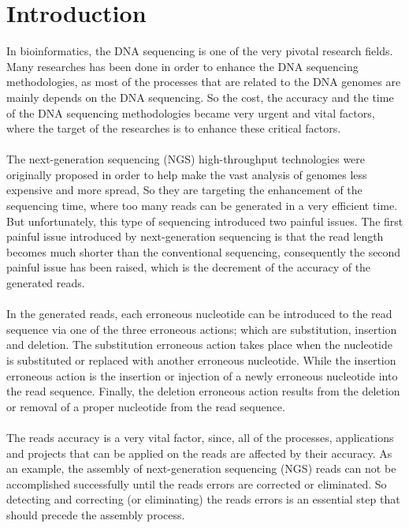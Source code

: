 \documentclass[12pt]{llncs}
\begin{document}
\chapter{\label{chap:1} Introduction}
%
In bioinformatics, the DNA sequencing is one of the very pivotal research fields. Many researches has been done in order to enhance the DNA sequencing methodologies, as most of the processes that are related to the DNA genomes are mainly depends on the DNA sequencing. So the cost, the accuracy and the time of the DNA sequencing methodologies became very urgent and vital factors, where the target of the researches is to enhance these critical factors.
\\
\\
The next-generation sequencing (NGS) high-throughput technologies \cite{NGS} were originally proposed in order to help make the vast analysis of genomes less expensive and more spread, So they are targeting the enhancement of the sequencing time, where too many reads can be generated in a very efficient time. But unfortunately, this type of sequencing introduced two painful issues. The first painful issue introduced by next-generation sequencing is that the read length becomes much shorter than the conventional sequencing, consequently the second painful issue has been raised, which is the decrement of the accuracy of the generated reads. 
\\
\\
In the generated reads, each erroneous nucleotide can be introduced to the read sequence via one of the three erroneous actions; which are substitution, insertion and deletion. 
The substitution erroneous action takes place when the nucleotide is substituted or replaced with another erroneous nucleotide. While the insertion erroneous action is the insertion or injection of a newly erroneous nucleotide into the read sequence. Finally, the deletion erroneous action results from the deletion or removal of a proper nucleotide from the read sequence.
\\
\\
The reads accuracy is a very vital factor, since, all of the processes, applications and projects that can be applied on the reads are affected by their accuracy. As an example, the assembly of next-generation sequencing (NGS) reads can not be accomplished successfully until the reads errors are corrected or eliminated. So detecting and correcting (or eliminating) the reads errors is an essential step that should precede the assembly process. 
\\
\end{document}
